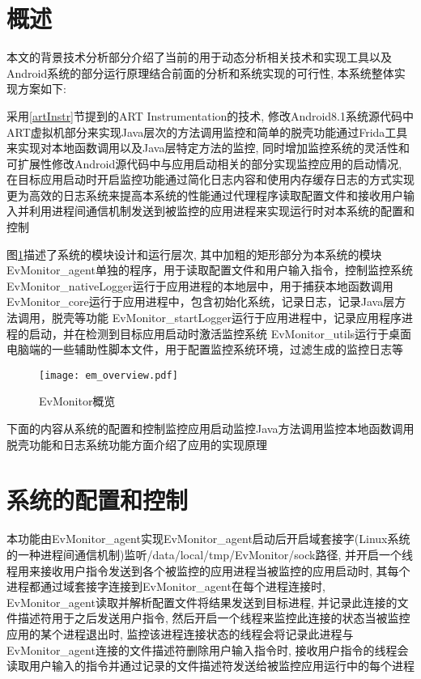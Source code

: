 \section{概述}
本文的背景技术分析部分介绍了当前的用于动态分析相关技术和实现工具以及Android系统的部分运行原理\juhao 结合前面的分析和系统实现的可行性, 本系统整体实现方案如下:

采用\ref{artInstr}节提到的ART Instrumentation的技术, 修改Android8.1系统源代码中ART虚拟机部分来实现Java层次的方法调用监控和简单的脱壳功能\juhao 通过Frida工具来实现对本地函数调用以及Java层特定方法的监控, 同时增加监控系统的灵活性和可扩展性\juhao 修改Android源代码中与应用启动相关的部分实现监控应用的启动情况, 在目标应用启动时开启监控功能\juhao 通过简化日志内容和使用内存缓存日志的方式实现更为高效的日志系统来提高本系统的性能\juhao 通过代理程序读取配置文件和接收用户输入并利用进程间通信机制发送到被监控的应用进程来实现运行时对本系统的配置和控制\juhao 

图\ref{emOverview}描述了系统的模块设计和运行层次, 其中加粗的矩形部分为本系统的模块\juhao 
EvMonitor\_agent单独的程序，用于读取配置文件和用户输入指令，控制监控系统\juhao 
EvMonitor\_nativeLogger运行于应用进程的本地层中，用于捕获本地函数调用\juhao
EvMonitor\_core运行于应用进程中，包含初始化系统，记录日志，记录Java层方法调用，脱壳等功能\juhao
EvMonitor\_startLogger运行于应用进程中，记录应用程序进程的启动，并在检测到目标应用启动时激活监控系统\juhao 
EvMonitor\_utils运行于桌面电脑端的一些辅助性脚本文件，用于配置监控系统环境，过滤生成的监控日志等
\begin{figure}[ht]
	\centering
	\texttt{[image: em\_overview.pdf]}
	\caption{EvMonitor概览}
	\label{emOverview}
\end{figure}

下面的内容从系统的配置和控制\dunhao 监控应用启动\dunhao 监控Java方法调用\dunhao 监控本地函数调用\dunhao 脱壳功能和日志系统功能方面介绍了应用的实现原理\juhao
\section{系统的配置和控制}
本功能由EvMonitor\_agent实现\juhao EvMonitor\_agent启动后开启域套接字(Linux系统的一种进程间通信机制)监听/data/local/tmp/EvMonitor/sock路径, 并开启一个线程用来接收用户指令发送到各个被监控的应用进程\juhao 当被监控的应用启动时, 其每个进程都通过域套接字连接到EvMonitor\_agent\juhao 在每个进程连接时, EvMonitor\_agent读取并解析配置文件将结果发送到目标进程, 并记录此连接的文件描述符用于之后发送用户指令, 然后开启一个线程来监控此连接的状态\juhao 当被监控应用的某个进程退出时, 监控该进程连接状态的线程会将记录此进程与EvMonitor\_agent连接的文件描述符删除\juhao 用户输入指令时, 接收用户指令的线程会读取用户输入的指令并通过记录的文件描述符发送给被监控应用运行中的每个进程\juhao 

